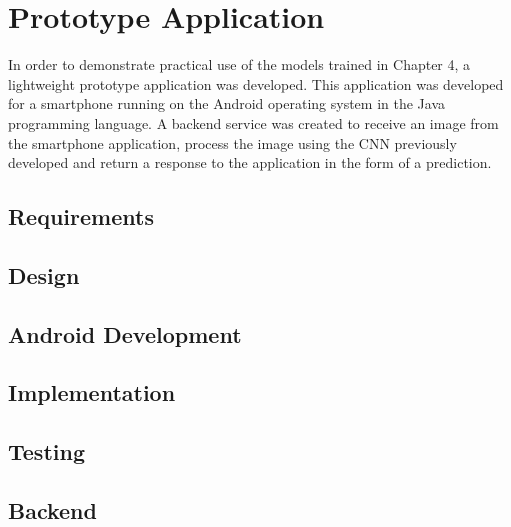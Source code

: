 \chapter{Prototype Application}
\label{prototype}
In order to demonstrate practical use of the models trained in Chapter 4, a lightweight prototype application was developed.
This application was developed for a smartphone running on the Android operating system in the Java programming language.
A backend service was created to receive an image from the smartphone
application, process the image using the CNN previously developed and return a
response to the application in the form of a prediction.

\section{Requirements}


\section{Design}


\section{Android Development}


\section{Implementation}


\section{Testing}


\section{Backend}
